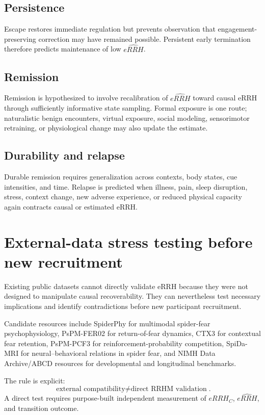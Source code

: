 \documentclass[9pt,twocolumn]{article}
\begin{document}
\subsection{Persistence}
Escape restores immediate regulation but prevents observation that engagement-preserving correction may have remained possible. Persistent early termination therefore predicts maintenance of low $\widehat{eRRH}$.

\subsection{Remission}
Remission is hypothesized to involve recalibration of $\widehat{eRRH}$ toward causal eRRH through sufficiently informative state sampling. Formal exposure is one route; naturalistic benign encounters, virtual exposure, social modeling, sensorimotor retraining, or physiological change may also update the estimate.

\subsection{Durability and relapse}
Durable remission requires generalization across contexts, body states, cue intensities, and time. Relapse is predicted when illness, pain, sleep disruption, stress, context change, new adverse experience, or reduced physical capacity again contracts causal or estimated eRRH.

\section{External-data stress testing before new recruitment}
Existing public datasets cannot directly validate eRRH because they were not designed to manipulate causal recoverability. They can nevertheless test necessary implications and identify contradictions before new participant recruitment.

Candidate resources include SpiderPhy for multimodal spider-fear psychophysiology, PsPM-FER02 for return-of-fear dynamics, CTX3 for contextual fear retention, PsPM-PCF3 for reinforcement-probability competition, SpiDa-MRI for neural--behavioral relations in spider fear, and NIMH Data Archive/ABCD resources for developmental and longitudinal benchmarks.

The rule is explicit:
\[
\boxed{\text{external compatibility}\neq\text{direct RRHM validation}}.
\]
A direct test requires purpose-built independent measurement of $eRRH_C$, $\widehat{eRRH}$, and transition outcome.
\end{document}
